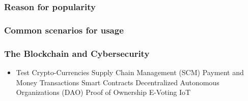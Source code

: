 \subsubsection{Reason for popularity}

\subsubsection{Common scenarios for usage}
\subsubsection{The Blockchain and Cybersecurity}


\begin{itemize}
\item Test
  \subitem Crypto-Currencies
  \subitem Supply Chain Management (SCM)
  \subitem Payment and Money Transactions
  \subitem Smart Contracts
  \subitem Decentralized Autonomous Organizations (DAO)
  \subitem Proof of Ownership
  \subitem E-Voting
  \subitem IoT
\end{itemize}
